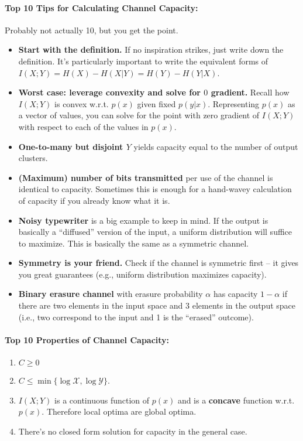\documentclass[a4paper,12pt]{report}
\begin{document}
\paragraph{Top 10 Tips for Calculating Channel Capacity: } Probably not actually
10, but you get the point.
\begin{itemize}
\item \textbf{Start with the definition.} If no inspiration strikes, just write
down the definition. It's particularly important to write the equivalent forms
of $I(X; Y) = H(X) - H(X|Y) = H(Y) - H(Y|X)$. 
\item \textbf{Worst case: leverage convexity and solve for $0$ gradient.} Recall
how $I(X; Y)$ is convex w.r.t. $p(x)$ given fixed $p(y|x)$. Representing $p(x)$
as a vector of values, you can solve for the point with zero gradient of $I(X;
Y)$ with respect to each of the values in $p(x)$.
\item \textbf{One-to-many but disjoint $Y$} yields capacity equal to the number
of output clusters. 
\item \textbf{(Maximum) number of bits transmitted} per use of the channel is
identical to capacity. Sometimes this is enough for a hand-wavey calculation of
capacity if you already know what it is. 
\item \textbf{Noisy typewriter} is a big example to keep in mind. If the output
is basically a ``diffused'' version of the input, a uniform distribution will
suffice to maximize. This is basically the same as a symmetric channel.
\item \textbf{Symmetry is your friend.} Check if the channel is symmetric first
-- it gives you great guarantees (e.g., uniform distribution maximizes
capacity).
\item \textbf{Binary erasure channel} with erasure probability $\alpha$ has
capacity $1-\alpha$ if there are two elements in the input space and 3 elements
in the output space (i.e., two correspond to the input and 1 is the ``erased''
outcome).
\end{itemize}



\paragraph{Top 10 Properties of Channel Capacity: } 
\begin{enumerate}
\item $C \geq 0$
\item $C \leq \min \{\log \mathcal X, \log \mathcal Y\}$.
\item $I(X; Y)$ is a continuous function of $p(x)$ and is a \textbf{concave}
function w.r.t. $p(x)$. Therefore local optima are global optima.
\item There's no closed form solution for capacity in the general case. 
\end{enumerate}
\end{document}
